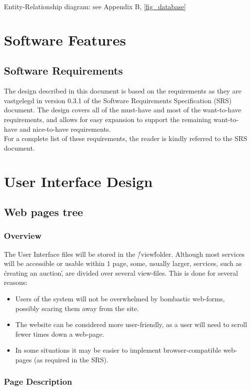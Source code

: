\documentclass[salesmen, twoside]{../../../templates/latex/2009/softproj}
\begin{document}
\begin{projdoc}
Entity-Relationship diagram: see Appendix B, \ref{fig_database}

\chapter{Software Features}
\section {Software Requirements}
The design described in this document is based on the requirements as they are vastgelegd in version 0.3.1 of the Software Requirements Specification (SRS) document.
The design covers all of the must-have and most of the want-to-have requirements, and allows for easy expansion to support the remaining want-to-have and nice-to-have requirements.\\
For a complete list of these requirements, the reader is kindly referred to the SRS document.

\chapter{User Interface Design \label{UI Design}}
\section{Web pages tree}
\subsection{Overview}
The User Interface files will be stored in the \'/view\' folder. Although most services will be accessible or usable within 1 page, some, usually larger, services, such as \'creating an auction\', are divided over several view-files. This is done for several reasons:
\begin{itemize}
\item Users of the system will not be overwhelmed by bombastic web-forms, possibly scaring them away from the site.
\item The website can be considered more user-friendly, as a user will need to scroll fewer times down a web-page.
\item In some situations it may be easier to implement browser-compatible web-pages (as required in the SRS).
\end{itemize}

\subsection{Page Description}

\end{projdoc}
\end{document}
